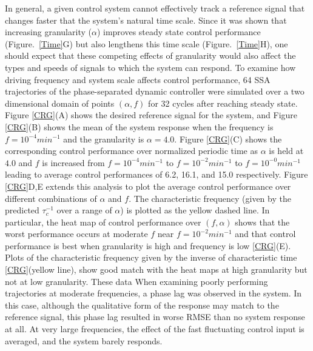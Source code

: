 \documentclass[12pt]{iopart}
\begin{document}
In general, a given control system cannot effectively track a reference signal that changes faster that the system's natural time scale. Since it was shown that increasing granularity ($\alpha$) improves steady state control performance (Figure.\ \ref{Time}G) but also lengthens this time scale (Figure.\ \ref{Time}H), one should expect that these competing effects of granularity would also affect the types and speeds of signals to which the system can respond.
To examine how driving frequency and system scale affects control performance, 64 SSA trajectories of the phase-separated dynamic controller were simulated over a two dimensional domain of points $(\alpha,f)$ for 32 cycles after reaching steady state. Figure \ref{CRG}(A) shows the desired reference signal for the system, and Figure \ref{CRG}(B) shows the mean of the system response when the frequency is $f=10^{-4} min^{-1}$  and the granularity is $\alpha = 4.0$.  Figure \ref{CRG}(C) shows the corresponding control performance over normalized periodic time as $\alpha$ is held at $4.0$ and $f$ is increased from $f=10^{-4}min^{-1}$ \brian[Units]  to $f=10^{-2}min^{-1}$ \brian[Units]  to $f=10^{-0}min^{-1}$ \brian[Units]  leading to average control performances of 6.2, 16.1, and 15.0 respectively. 
Figure \ref{CRG}D,E extends this analysis to plot the average control performance over different combinations of $\alpha$ and $f$. The characteristic frequency (given by the predicted $\tau_c^{-1}$ over a range of $\alpha$) is plotted as the yellow dashed line.
In particular, the heat map of control performance over $(f,\alpha)$ shows that the worst performance occurs at moderate $f$ near $f=10^{-2}min^{-1}$ and that control performance is best when granularity is high and frequency is low \ref{CRG}(E). Plots of the characteristic frequency given by the inverse of characteristic time \ref{CRG}(yellow line), show good match with the heat maps at high granularity but not at low granularity. These data
 When examining poorly performing trajectories at moderate frequencies, a phase lag was observed in the system. In this case, although the qualitative form of the response may match to the reference signal, this phase lag resulted in worse RMSE than no system response at all.  At very large frequencies, the effect of the fast fluctuating control input is averaged, and the system barely responds. 
\end{document}
